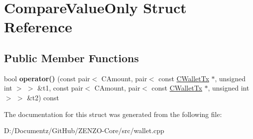 \hypertarget{struct_compare_value_only}{}\section{Compare\+Value\+Only Struct Reference}
\label{struct_compare_value_only}
\subsection*{Public Member Functions}
\begin{DoxyCompactItemize}
\item 
\mbox{\label{struct_compare_value_only_a423bf5200199a41849aabb4b6ae46d94}} 
bool {\bfseries operator()} (const pair$<$ C\+Amount, pair$<$ const \mbox{\hyperlink{class_c_wallet_tx}{C\+Wallet\+Tx}} $\ast$, unsigned int $>$ $>$ \&t1, const pair$<$ C\+Amount, pair$<$ const \mbox{\hyperlink{class_c_wallet_tx}{C\+Wallet\+Tx}} $\ast$, unsigned int $>$ $>$ \&t2) const
\end{DoxyCompactItemize}


The documentation for this struct was generated from the following file\+:\begin{DoxyCompactItemize}
\item 
D\+:/\+Documentz/\+Git\+Hub/\+Z\+E\+N\+Z\+O-\/\+Core/src/wallet.\+cpp\end{DoxyCompactItemize}
